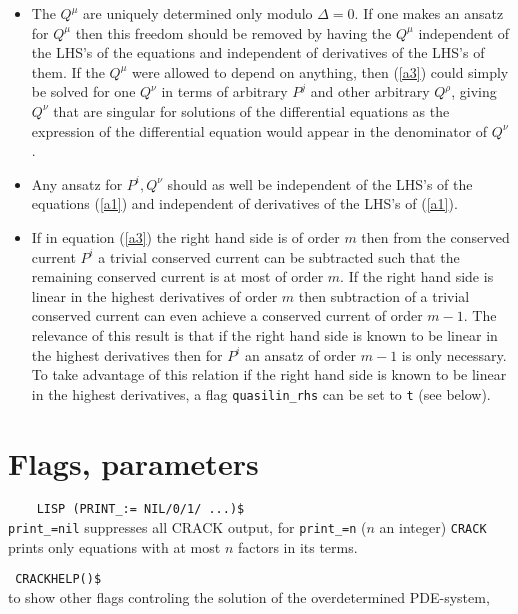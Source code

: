 \documentclass[12pt]{article}
\begin{document}
\begin{itemize}
\item The $Q^{\mu}$ are uniquely determined only modulo $\Delta=0$.
If one makes an ansatz for $Q^{\mu}$ then this freedom should be removed
by having
the $Q^{\mu}$ independent of the LHS's of the equations and independent of
derivatives of the LHS's of them. If the $Q^{\mu}$ were allowed to depend on
anything, then (\ref{a3}) could simply be solved for one $Q^{\nu}$ in terms of
arbitrary $P^j$ and other arbitrary $Q^{\rho}$, giving $Q^{\nu}$ that are
singular for solutions of the differential equations as the expression
of the differential equation would appear in the denominator of $Q^{\nu}$.

\item Any ansatz for $P^i,Q^{\nu}$ should
as well be independent of the LHS's of the equations (\ref{a1}) and
independent of derivatives of the LHS's of (\ref{a1}).

\item If in equation (\ref{a3}) the right hand side is of order $m$ then
from the conserved current $P^i$ a trivial conserved current can be
subtracted such that the remaining conserved current is at most of order $m$.
If the right hand side is linear in the highest derivatives of order
$m$ then subtraction of a trivial conserved current can even achieve a
conserved current of order $m-1$. The relevance of this result is that
if the right hand side is known to be linear in the highest derivatives
then for $P^i$ an ansatz of order $m-1$ is only necessary. To take
advantage of this relation
if the right hand side is known to be linear in the highest
derivatives, a flag {\tt quasilin\_rhs} can be set to {\tt t} (see
below).

\end{itemize}

\section{Flags, parameters}

\verb+    LISP (PRINT_:= NIL/0/1/ ...)$+ \\
\verb+print_=nil+ suppresses all CRACK output, for \verb+print_=n+
($n$ an integer)
{\tt CRACK} prints only equations with at most $n$ factors in its terms.


\verb+ CRACKHELP()$+ \\
to show other flags controling the solution of the overdetermined PDE-system,
\end{document}
